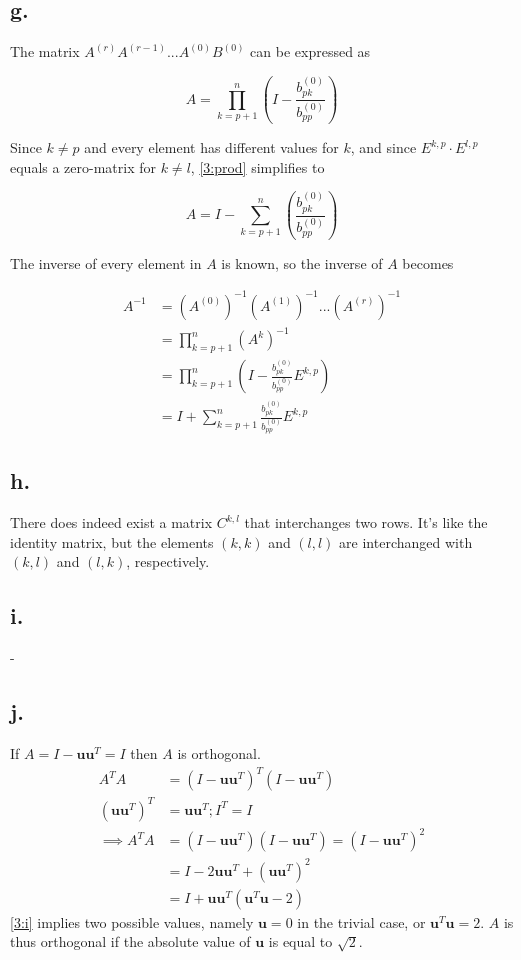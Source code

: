 \documentclass[00-main.tex]{subfiles}
\begin{document}
\subsection*{g.}
The matrix $A^{(r)}A^{(r-1)} ... A^{(0)}B^{(0)}$ can be expressed as

\begin{equation}
\label{3:prod}
A = \prod\limits_{k=p+1}^n ( I - \frac{b^{(0)}_{pk}}{b^{(0)}_{pp}} ) 
\end{equation}

Since $k \neq p$ and every element has different values for $k$, and since $E^{k,p} \cdot E^{l,p}$ equals a zero-matrix for $k \neq l$, \cref{3:prod} simplifies to 

\begin{equation}
\label{prod}
A = I - \sum \limits_{k=p+1}^n ( \frac{b^{(0)}_{pk}}{b^{(0)}_{pp}} ) 
\end{equation}

The inverse of every element in $A$ is known, so the inverse of $A$ becomes

\begin{align*}
A^{-1} &= (A^{(0)})^{-1} (A^{(1)})^{-1} ... (A^{(r)})^{-1} \\
&= \prod\limits_{k=p+1}^n \left( A^k \right)^{-1} \\
&= \prod\limits_{k=p+1}^n \left( I - \frac{b^{(0)}_{pk}}{b^{(0)}_{pp}} E^{k,p} \right) \\
&= I + \sum \limits_{k=p+1}^n \frac{b^{(0)}_{pk}}{b^{(0)}_{pp}} E^{k,p} 
\end{align*}

\subsection*{h.}
There does indeed exist a matrix $C^{k,l}$ that interchanges two rows. It's like the identity matrix, but the elements $(k,k)$ and $(l,l)$ are interchanged with $(k,l)$ and $(l,k)$, respectively.

\subsection*{i.}
-


\subsection*{j.}
If $A = I - \mathbf{uu}^T = I$ then $A$ is orthogonal.
\begin{align}
\nonumber
A^T A &= (I - \mathbf{uu}^T )^T (I - \mathbf{uu}^T) \\
\nonumber
(\mathbf{uu}^T)^T &= \mathbf{uu}^T; I^T = I \\
\implies
\nonumber
A^T A &= (I - \mathbf{uu}^T ) (I - \mathbf{uu}^T) = (I - \mathbf{uu}^T)^2 \\
\nonumber 
&= I - 2 \mathbf{uu}^T + ( \mathbf{uu}^T)^2 \\
&= I + \mathbf{uu}^T (\mathbf{u}^T\mathbf{u} - 2)
\label{3:i}
\end{align}
\cref{3:i} implies two possible values, namely $\mathbf{u} = 0$ in the trivial case, or $\mathbf{u}^T\mathbf{u} = 2$.
$A$ is thus orthogonal if the absolute value of  $\mathbf{u}$ is equal to $\sqrt{2}$.




\end{document}
